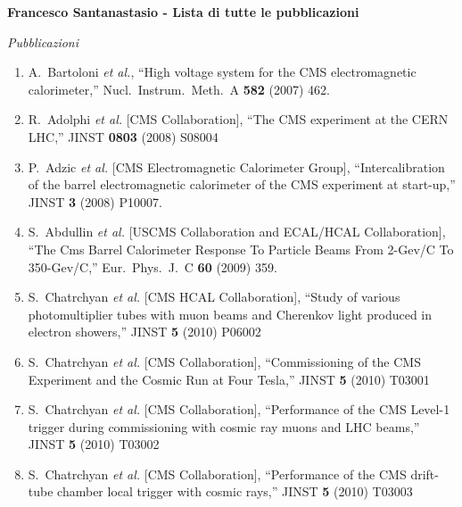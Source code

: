 \documentclass[10pt]{letter}
\begin{document}
{\large \sc \bf Francesco Santanastasio - Lista di tutte le pubblicazioni}

\begin{center} \textit{Pubblicazioni} \end{center}

\begin{enumerate}

\item A.~Bartoloni {\it et al.},
  ``High voltage system for the CMS electromagnetic calorimeter,''
  Nucl.\ Instrum.\ Meth.\  A {\bf 582} (2007) 462.

\item R.~Adolphi {\it et al.}  [CMS Collaboration],
  ``The CMS experiment at the CERN LHC,''
  JINST {\bf 0803} (2008) S08004

\item P.~Adzic {\it et al.}  [CMS Electromagnetic Calorimeter Group],
  ``Intercalibration of the barrel electromagnetic calorimeter of the CMS
  experiment at start-up,'' JINST {\bf 3} (2008) P10007.

\item S.~Abdullin {\it et al.}  [USCMS Collaboration and ECAL/HCAL Collaboration],
  ``The Cms Barrel Calorimeter Response To Particle Beams From 2-Gev/C To 350-Gev/C,''
  Eur.\ Phys.\ J.\  C {\bf 60} (2009) 359.

\item S.~Chatrchyan {\it et al.}  [CMS HCAL Collaboration],
  ``Study of various photomultiplier tubes with muon beams and Cherenkov light produced in electron showers,''
  JINST {\bf 5} (2010) P06002

\item S.~Chatrchyan {\it et al.}  [CMS Collaboration],
  ``Commissioning of the CMS Experiment and the Cosmic Run at Four Tesla,''
  JINST {\bf 5} (2010) T03001

\item S.~Chatrchyan {\it et al.}  [CMS Collaboration],
  ``Performance of the CMS Level-1 trigger during commissioning with cosmic ray muons and LHC beams,''
  JINST {\bf 5} (2010) T03002

\item S.~Chatrchyan {\it et al.}  [CMS Collaboration],
  ``Performance of the CMS drift-tube chamber local trigger with cosmic rays,''
  JINST {\bf 5} (2010) T03003


\end{enumerate}
\end{document}
